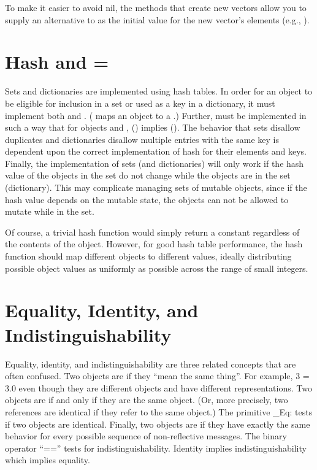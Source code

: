 \documentclass[letterpaper,10pt,english]{sphinxmanual}
\begin{document}
To make it easier to avoid nil, the methods that create new vectors allow you to supply an alternative
to  as the initial value for the new vector’s elements (e.g., ).


\section{Hash and =}
\label{progguid:hash-and}
Sets and dictionaries are implemented using hash tables. In order for an object to be eligible for inclusion
in a set or used as a key in a dictionary, it must implement both \code{=} and . ( maps
an object to a .) Further,  must be implemented in such a way that for objects  and
, () implies (). The behavior that sets disallow duplicates and
dictionaries disallow multiple entries with the same key is dependent upon the correct implementation
of hash for their elements and keys. Finally, the implementation of sets (and dictionaries)
will only work if the hash value of the objects in the set do not change while the objects are in the
set (dictionary). This may complicate managing sets of mutable objects, since if the hash value
depends on the mutable state, the objects can not be allowed to mutate while in the set.

Of course, a trivial hash function would simply return a constant regardless of the contents of the
object. However, for good hash table performance, the hash function should map different objects
to different values, ideally distributing possible object values as uniformly as possible across the
range of small integers.


\section{Equality, Identity, and Indistinguishability}
\label{progguid:equality-identity-and-indistinguishability}
Equality, identity, and indistinguishability are three related concepts that are often confused. Two
objects are  if they “mean the same thing”. For example, 3 = 3.0 even though they are different
objects and have different representations. Two objects are  if and only if they are
the same object. (Or, more precisely, two references are identical if they refer to the same object.)
The primitive \_Eq: tests if two objects are identical. Finally, two objects are  if
they have exactly the same behavior for every possible sequence of non-reflective messages. The
binary operator “==” tests for indistinguishability. Identity implies indistinguishability which implies
equality.
\end{document}
